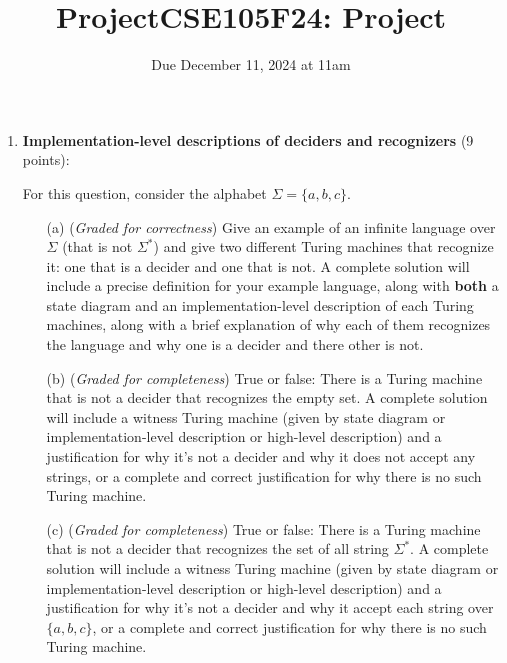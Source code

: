 \documentclass[12pt, oneside]{article}
\newcommand{\gradeCorrect}{({\it Graded for correctness}) }
\newcommand{\gradeComplete}{({\it Graded for completeness}) }
\begin{document}
\begin{enumerate}[wide, labelwidth=!, labelindent=0pt]
\begin{enumerate}
\end{enumerate}



\item\textbf{Implementation-level descriptions of deciders and recognizers} (9 points):

For this question, consider the alphabet $\Sigma = \{a,b,c\}$.
\begin{enumerate}
\item[(a)]\gradeCorrect Give an example of an infinite language over $\Sigma$ (that is not $\Sigma^*$) and give
two different Turing machines that recognize it: one that is a decider and one that is not.
A complete solution will include a precise definition for your example language, 
along with {\bf both} a state diagram and an implementation-level description 
of each Turing machines, along with a brief explanation of why each of them recognizes
the language and why one is a decider and there other is not.

\item[(b)]\gradeComplete True or false: There is a Turing machine that is not a decider that recognizes 
the empty set. A complete solution will include a witness Turing machine (given by 
state diagram or implementation-level description or high-level description) and a justification 
for why it's not a decider and why it does not accept any strings, or a complete and correct
justification for why there is no such Turing machine.

\item[(c)]\gradeComplete True or false: There is a Turing machine that is not a decider that recognizes 
the set of all string $\Sigma^*$.  A complete solution will include a witness Turing machine 
(given by 
state diagram or implementation-level description or high-level description) and a justification 
for why it's not a decider and why it accept each string over $\{a,b,c\}$, or a complete and correct
justification for why there is no such Turing machine.
\end{enumerate}
\end{enumerate}
\newpage
\titleformat{\subsubsection}[runin]
   {\normalfont\bfseries}{}{}{}
   
\title{ProjectCSE105F24: Project}
\date{Due December 11, 2024 at 11am}


\maketitle
\end{document}
